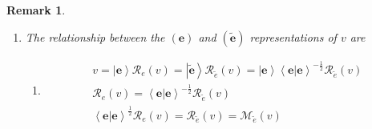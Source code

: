 \documentclass[aps,preprint]{revtex4}%
\newtheorem{remark}[theorem]{Remark}
\begin{document}
\begin{remark}
\begin{enumerate}
\begin{enumerate}
\item vectors $v$
\begin{align}
v  &  =\left\vert \mathbf{e}\right\rangle \left\langle \left.  \mathbf{e}%
\right\vert \mathbf{e}\right\rangle ^{-1}\left\langle \mathbf{e}\right\vert
v=\left\vert \mathbf{e}\right\rangle \left\langle \left.  \mathbf{e}%
\right\vert \mathbf{e}\right\rangle ^{-1}\mathcal{M}_{e}\left(  v\right)
=\left\vert \mathbf{e}\right\rangle \mathcal{R}_{e}\left(  v\right) \\
v  &  =\left\vert \widetilde{\mathbf{e}}\right\rangle \left\langle
\widetilde{\mathbf{e}}\right\vert v=\left\vert \widetilde{\mathbf{e}%
}\right\rangle \mathcal{M}_{\widetilde{e}}\left(  v\right)  =\left\vert
\widetilde{\mathbf{e}}\right\rangle \mathcal{R}_{\widetilde{e}}\left(
v\right)
\end{align}


\item as
\begin{align}
T_{\widetilde{e}e}\left\vert \mathbf{e}\right\rangle \mathcal{R}%
_{\widetilde{e}}\left(  v\right)   &  =\left\vert \widetilde{\mathbf{e}%
}\right\rangle \left\langle \left.  \mathbf{e}\right\vert \mathbf{e}%
\right\rangle ^{-1}\left\langle \mathbf{e}\right\vert \left\vert
\mathbf{e}\right\rangle \mathcal{R}_{\widetilde{e}}\left(  v\right)
=\left\vert \widetilde{\mathbf{e}}\right\rangle \mathcal{R}_{\widetilde{e}%
}\left(  v\right) \\
T_{\widetilde{e}e}\left\vert \mathbf{e}\right\rangle \mathcal{R}%
_{\widetilde{e}}\left(  v\right)   &  =\left\vert \mathbf{e}\right\rangle
\left\langle \left.  \mathbf{e}\right\vert \mathbf{e}\right\rangle ^{-\frac
{1}{2}}\mathcal{R}_{\widetilde{e}}\left(  v\right)  .
\end{align}

\end{enumerate}

\item The relationship between the $\left(  \mathbf{e}\right)  $ and $\left(
\widetilde{\mathbf{e}}\right)  $ representations of $v$ are

\begin{enumerate}
\item
\begin{gather}
v=\left\vert \mathbf{e}\right\rangle \mathcal{R}_{e}\left(  v\right)
=\left\vert \widetilde{\mathbf{e}}\right\rangle \mathcal{R}_{\widetilde{e}%
}\left(  v\right)  =\left\vert \mathbf{e}\right\rangle \left\langle \left.
\mathbf{e}\right\vert \mathbf{e}\right\rangle ^{-\frac{1}{2}}\mathcal{R}%
_{\widetilde{e}}\left(  v\right) \\
\mathcal{R}_{e}\left(  v\right)  =\left\langle \left.  \mathbf{e}\right\vert
\mathbf{e}\right\rangle ^{-\frac{1}{2}}\mathcal{R}_{\widetilde{e}}\left(
v\right) \\
\left\langle \left.  \mathbf{e}\right\vert \mathbf{e}\right\rangle ^{\frac
{1}{2}}\mathcal{R}_{e}\left(  v\right)  =\mathcal{R}_{\widetilde{e}}\left(
v\right)  =\mathcal{M}_{\widetilde{e}}\left(  v\right)
\end{gather}



\end{enumerate}
\end{enumerate}
\end{remark}
\end{document}
